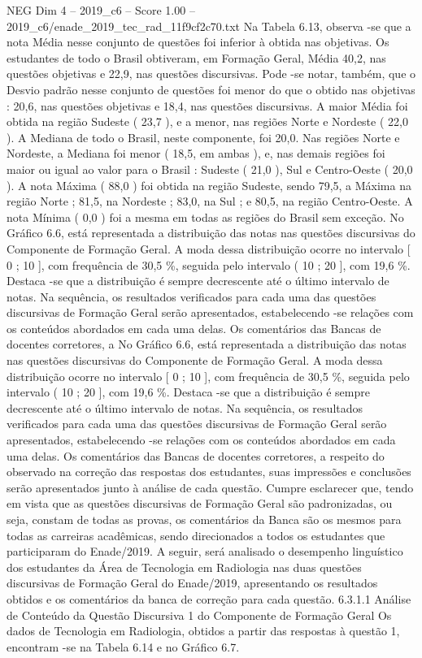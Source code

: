 \begin{textsample}{NEG Dim 4 – 2019\_c6 – Score 1.00 – 2019\_c6/enade\_2019\_tec\_rad\_11f9cf2c70.txt}
Na Tabela 6.13, observa -se que a nota Média nesse conjunto de questões foi inferior à obtida nas objetivas.
Os estudantes de todo o Brasil obtiveram, em Formação Geral, Média 40,2, nas questões objetivas e 22,9, nas questões discursivas.
Pode -se notar, também, que o Desvio padrão nesse conjunto de questões foi menor do que o obtido nas objetivas : 20,6, nas questões objetivas e 18,4, nas questões discursivas.
A maior Média foi obtida na região Sudeste ( 23,7 ), e a menor, nas regiões Norte e Nordeste ( 22,0 ).
A Mediana de todo o Brasil, neste componente, foi 20,0.
Nas regiões Norte e Nordeste, a Mediana foi menor ( 18,5, em ambas ), e, nas demais regiões foi maior ou igual ao valor para o Brasil : Sudeste ( 21,0 ), Sul e Centro-Oeste ( 20,0 ).
A nota Máxima ( 88,0 ) foi obtida na região Sudeste, sendo 79,5, a Máxima na região Norte ; 81,5, na Nordeste ; 83,0, na Sul ; e 80,5, na região Centro-Oeste.
A nota Mínima ( 0,0 ) foi a mesma em todas as regiões do Brasil sem exceção.
No Gráfico 6.6, está representada a distribuição das notas nas questões discursivas do Componente de Formação Geral.
A moda dessa distribuição ocorre no intervalo [ 0 ; 10 ], com frequência de 30,5 \%, seguida pelo intervalo ( 10 ; 20 ], com 19,6 \%.
Destaca -se que a distribuição é sempre decrescente até o último intervalo de notas.
Na sequência, os resultados verificados para cada uma das questões discursivas de Formação Geral serão apresentados, estabelecendo -se relações com os conteúdos abordados em cada uma delas.
Os comentários das Bancas de docentes corretores, a No Gráfico 6.6, está representada a distribuição das notas nas questões discursivas do Componente de Formação Geral.
A moda dessa distribuição ocorre no intervalo [ 0 ; 10 ], com frequência de 30,5 \%, seguida pelo intervalo ( 10 ; 20 ], com 19,6 \%.
Destaca -se que a distribuição é sempre decrescente até o último intervalo de notas.
Na sequência, os resultados verificados para cada uma das questões discursivas de Formação Geral serão apresentados, estabelecendo -se relações com os conteúdos abordados em cada uma delas.
Os comentários das Bancas de docentes corretores, a respeito do observado na correção das respostas dos estudantes, suas impressões e conclusões serão apresentados junto à análise de cada questão.
Cumpre esclarecer que, tendo em vista que as questões discursivas de Formação Geral são padronizadas, ou seja, constam de todas as provas, os comentários da Banca são os mesmos para todas as carreiras acadêmicas, sendo direcionados a todos os estudantes que participaram do Enade/2019.
A seguir, será analisado o desempenho linguístico dos estudantes da Área de Tecnologia em Radiologia nas duas questões discursivas de Formação Geral do Enade/2019, apresentando os resultados obtidos e os comentários da banca de correção para cada questão. 6.3.1.1 Análise de Conteúdo da Questão Discursiva 1 do Componente de Formação Geral Os dados de Tecnologia em Radiologia, obtidos a partir das respostas à questão 1, encontram -se na Tabela 6.14 e no Gráfico 6.7.

\end{textsample}
